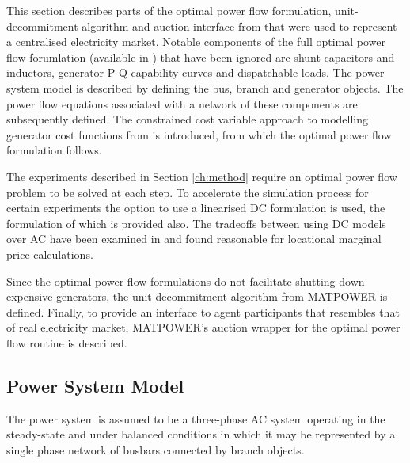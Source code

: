 This section describes parts of the optimal power flow formulation,
unit-decommitment algorithm and auction interface from \matpower that were used
to represent a centralised electricity market.  Notable components of the full
optimal power flow forumlation (available in \cite{pserc:mp_manual}) that have
been ignored are shunt capacitors and inductors, generator P-Q capability
curves and dispatchable loads. The power system model is described by defining
the bus, branch and generator objects.  The power flow equations associated with a network of these components are subsequently defined. The constrained cost variable approach to modelling generator cost
functions from \cite{zimmerman:ccv} is introduced, from which the optimal power
flow formulation follows.

The experiments described in Section \ref{ch:method} require an optimal power
flow problem to be solved at each step.  To accelerate the simulation process
for certain experiments the option to use a linearised DC formulation is used,
the formulation of which is provided also.  The tradeoffs between using DC
models over AC have been examined in \cite{overbye:acdc} and found reasonable
for locational marginal price calculations.

Since the optimal power flow formulations do not facilitate shutting down
expensive generators, the unit-decommitment algorithm from MATPOWER is defined.
Finally, to provide an interface to agent participants that resembles that of
real electricity market, MATPOWER's auction wrapper for the optimal power flow
routine is described.

\subsection{Power System Model}
\label{sec:power_system_model}
The power system is assumed to be a three-phase AC system operating in the
steady-state and under balanced conditions in which it may be represented by a
single phase network of busbars connected by branch objects.

